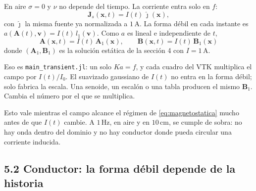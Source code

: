 \documentclass[11pt]{article}
\newcommand{\nv}{\nu}
\begin{document}
En aire \(\sigma=0\) y \(\nv\) no depende del tiempo. La corriente entra solo en \(f\):
\begin{equation}
\mathbf{J}_{s}(\mathbf{x},t)=I(t)\,\hat{\jmath}(\mathbf{x}),
\label{eq:Jt}
\end{equation}
con \(\hat{\jmath}\) la misma fuente ya normalizada a \(1\,\mathrm{A}\).
La forma débil en cada instante es \(a(\mathbf{A}(t),\mathbf{v})=I(t)\,l_{1}(\mathbf{v})\).
Como \(a\) es lineal e independiente de \(t\),
\begin{equation}
\boxed{\;
\mathbf{A}(\mathbf{x},t)=I(t)\,\mathbf{A}_{1}(\mathbf{x}),
\qquad
\mathbf{B}(\mathbf{x},t)=I(t)\,\mathbf{B}_{1}(\mathbf{x})
\;}
\label{eq:escala}
\end{equation}
donde \((\mathbf{A}_{1},\mathbf{B}_{1})\) es la solución estática de la sección 4 con \(I=1\,\mathrm{A}\).

Eso es \texttt{main\_transient.jl}: un solo \(Ka=f\), y cada cuadro del VTK multiplica el campo por \(I(t)/I_{0}\). El suavizado gaussiano de \(I(t)\) no entra en la forma débil; solo fabrica la escala. Una senoide, un escalón o una tabla producen el mismo \(\mathbf{B}_{1}\). Cambia el número por el que se multiplica.

Esto vale mientras el campo alcance el régimen de \eqref{eq:magnetostatica} mucho antes de que \(I(t)\) cambie. A \(1\,\mathrm{Hz}\), en aire y en \(10\,\mathrm{cm}\), se cumple de sobra: no hay onda dentro del dominio y no hay conductor donde pueda circular una corriente inducida.

\subsection*{5.2 Conductor: la forma débil depende de la historia}
\end{document}
